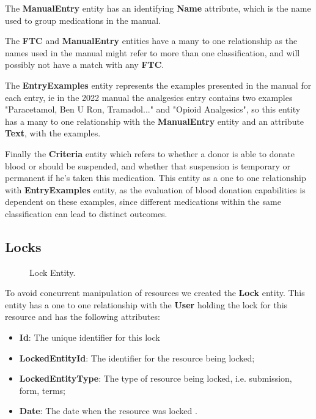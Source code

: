 The \textbf{ManualEntry} entity has an identifying \textbf{Name} attribute, which is the name used to group medications in the manual.

The \textbf{FTC} and \textbf{ManualEntry} entities have a many to one relationship as the names used in the manual might refer to more than one classification, and will possibly not have a match with any \textbf{FTC}.

The \textbf{EntryExamples} entity represents the examples presented in the manual for each entry, ie in the 2022 manual the analgesics entry contains two examples "Paracetamol, Ben U Ron, Tramadol..." and "Opioid Analgesics", so this entity has a many to one relationship with the \textbf{ManualEntry} entity and an attribute \textbf{Text}, with the examples.

Finally the \textbf{Criteria} entity which refers to whether a donor is able to donate blood or should be suspended, and whether that suspension is temporary or permanent if he's taken this medication. This entity as a one to one relationship with \textbf{EntryExamples} entity, as the evaluation of blood donation capabilities is dependent on these examples, since different medications within the same classification can lead to distinct outcomes.

\subsection{Locks}\label{sec:lock_entity}

\begin{figure}[H]
	\begin{center}
	\end{center}
	\caption{Lock Entity.}
\end{figure}

To avoid concurrent manipulation of resources we created the \textbf{Lock} entity. This entity has a
one to one relationship with the \textbf{User} holding the lock for this resource and has the following
attributes:

\begin{itemize}
	\item \textbf{Id}: The unique identifier for this lock
	\item \textbf{LockedEntityId}: The identifier for the resource being locked;
	\item \textbf{LockedEntityType}: The type of resource being locked, i.e. submission, form, terms;
	\item \textbf{Date}: The date when the resource was locked .
\end{itemize}